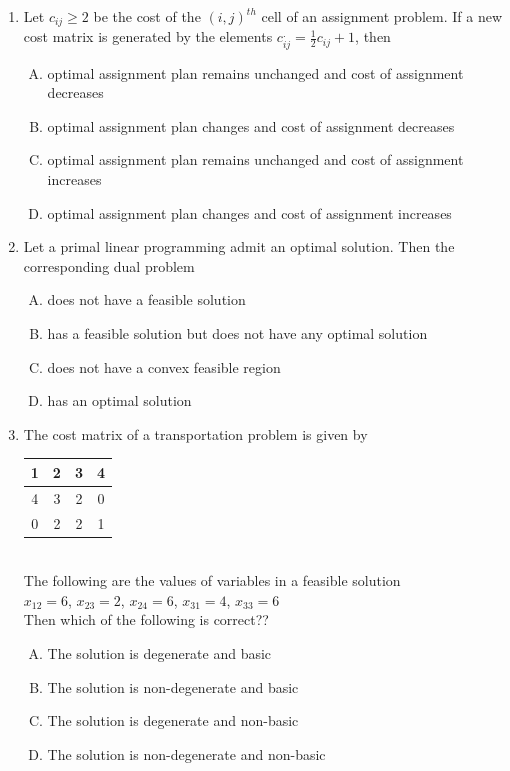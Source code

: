 \documentclass[journal,12pt,twocolumn]{IEEEtran}
\begin{document}
\begin{enumerate}
\item Let $c_{ij} \! \geqslant \! 2$ be the cost of the $(i,j)^{th}$ cell of an assignment problem. If a new cost matrix is generated by the elements $c_{ij}^{.} \! = \! \frac{1}{2}c_{ij} \! + \! 1$, then
\begin{enumerate}[(A)]
\setlength\itemsep{1em}
\item optimal assignment plan remains unchanged and cost of assignment decreases
\item optimal assignment plan changes and cost of assignment decreases
\item optimal assignment plan remains unchanged and cost of assignment increases
\item optimal assignment plan changes and cost of assignment increases
\end{enumerate}

\item Let a primal linear programming admit an optimal solution. Then the corresponding dual problem
\begin{enumerate}[(A)]
\setlength\itemsep{1em}
\item does not have a feasible solution
\item has a feasible solution but does not have any optimal solution
\item does not have a convex feasible region
\item has an optimal solution
\end{enumerate}

\item The cost matrix of a transportation problem is given by \\
\medskip
\begin{tabular}{|c|c|c|c|} \hline
1 & 2 & 3 & 4 \\ \hline
4 & 3 & 2 & 0 \\ \hline
0 & 2 & 2 & 1 \\ \hline
\end{tabular}
\\
\medskip
The following are the values of variables in a feasible solution \\
$x_{12} \! = \! 6$, $x_{23} \! = \! 2$, $x_{24} \! = \! 6$, $x_{31} \! = \! 4$, $x_{33} \! = \! 6$ \\
\medskip
Then which of the following is correct??
\begin{enumerate}[(A)]
\setlength\itemsep{1em}
\item The solution is degenerate and basic
\item The solution is non-degenerate and basic
\item The solution is degenerate and non-basic
\item The solution is non-degenerate and non-basic
\end{enumerate}


\end{enumerate}
\end{document}
